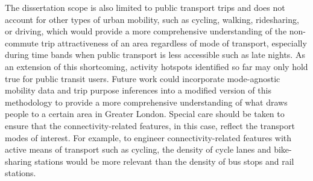 The dissertation scope is also limited to public transport trips and does not account for other types of urban mobility, such as cycling, walking, ridesharing, or driving, which would provide a more comprehensive understanding of the non-commute trip attractiveness of an area regardless of mode of transport, especially during time bands when public transport is less accessible such as late nights. As an extension of this shortcoming, activity hotspots identified so far may only hold true for public transit users. Future work could incorporate mode-agnostic mobility data and trip purpose inferences into a modified version of this methodology to provide a more comprehensive understanding of what draws people to a certain area in Greater London. Special care should be taken to ensure that the connectivity-related features, in this case, reflect the transport modes of interest. For example, to engineer connectivity-related features with active means of transport such as cycling, the density of cycle lanes and bike-sharing stations would be more relevant than the density of bus stops and rail stations.

